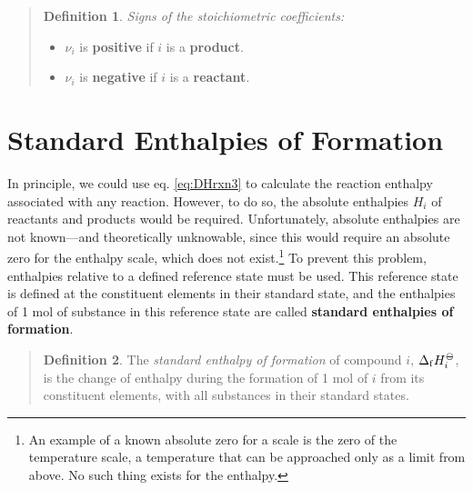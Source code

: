 \documentclass[
]{book}
\providecommand{\tightlist}{%
  \setlength{\itemsep}{0pt}\setlength{\parskip}{0pt}}
\theoremstyle{definition}
\newtheorem{definition}{Definition}[chapter]
\theoremstyle{definition}
\theoremstyle{definition}
\theoremstyle{remark}
\begin{document}
\begin{quote}
\begin{definition}
\protect\hypertarget{def:nui}{}{\label{def:nui} }\emph{Signs of the stoichiometric coefficients:}

\begin{itemize}
\tightlist
\item
  \(\nu_i\) is \textbf{positive} if \(i\) is a \textbf{product}.
\item
  \(\nu_i\) is \textbf{negative} if \(i\) is a \textbf{reactant}.
\end{itemize}
\end{definition}
\end{quote}

\hypertarget{formenthalpy}{%
\section{Standard Enthalpies of Formation}\label{formenthalpy}}

In principle, we could use eq. \eqref{eq:DHrxn3} to calculate the reaction enthalpy associated with any reaction. However, to do so, the absolute enthalpies \(H_i\) of reactants and products would be required. Unfortunately, absolute enthalpies are not known---and theoretically unknowable, since this would require an absolute zero for the enthalpy scale, which does not exist.\footnote{An example of a known absolute zero for a scale is the zero of the temperature scale, a temperature that can be approached only as a limit from above. No such thing exists for the enthalpy.} To prevent this problem, enthalpies relative to a deﬁned reference state must be used. This reference state is defined at the constituent elements in their standard state, and the enthalpies of 1 mol of substance in this reference state are called \textbf{standard enthalpies of formation}.

\begin{quote}
\begin{definition}
\protect\hypertarget{def:stdenthapies}{}{\label{def:stdenthapies} }
The \emph{standard enthalpy of formation} of compound \(i\), \(\Delta_{\mathrm{f}} H_i^{-\kern-6pt{\ominus}\kern-6pt-}\), is the change of enthalpy during the formation of 1 mol of \(i\) from its constituent elements, with all substances in their standard states.
\end{definition}
\end{quote}
\end{document}

